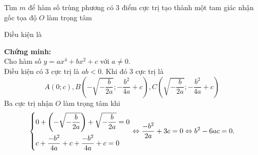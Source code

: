 \begin{vd}
{
	}
\end{vd}

\begin{dang}{Tìm $m$ để hàm số trùng phương có $3$ điểm cực trị tạo thành một tam giác nhận gốc tọa độ $O$ làm trọng tâm}
	\centerline{Điều kiện là }
	\textbf{Chứng minh:}\\
	Cho hàm số $y=ax^4+bx^2+c$ với $a\ne 0$.\\
	Điều kiện có 3 cực trị là $ab<0$. Khi đó 3 cực trị là 
	$$A\left(0;c\right), B\left(-\sqrt{-\dfrac{b}{2a}};-\dfrac{b^2}{4a}+c\right), C\left(\sqrt{-\dfrac{b}{2a}};-\dfrac{b^2}{4a}+c\right)$$
	Ba cực trị nhận $O$ làm trọng tâm khi 
	$$\left\{\begin{aligned}&0+\left(-\sqrt{-\dfrac{b}{2a}}\right)+\sqrt{-\dfrac{b}{2a}}=0\\
		&c+\dfrac{-b^2}{4a}+c+\dfrac{-b^2}{4a}+c=0\end{aligned}\right.
	\Leftrightarrow \dfrac{-b^2}{2a}+3c=0 \Leftrightarrow b^2-6ac=0.$$
\end{dang}

